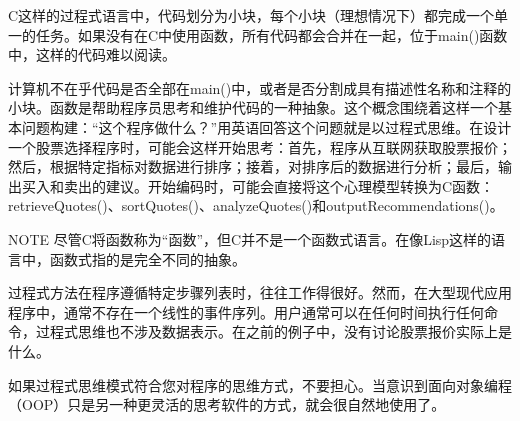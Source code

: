 C这样的过程式语言中，代码划分为小块，每个小块（理想情况下）都完成一个单一的任务。如果没有在C中使用函数，所有代码都会合并在一起，位于main()函数中，这样的代码难以阅读。

计算机不在乎代码是否全部在main()中，或者是否分割成具有描述性名称和注释的小块。函数是帮助程序员思考和维护代码的一种抽象。这个概念围绕着这样一个基本问题构建：“这个程序做什么？”用英语回答这个问题就是以过程式思维。在设计一个股票选择程序时，可能会这样开始思考：首先，程序从互联网获取股票报价；然后，根据特定指标对数据进行排序；接着，对排序后的数据进行分析；最后，输出买入和卖出的建议。开始编码时，可能会直接将这个心理模型转换为C函数：retrieveQuotes()、sortQuotes()、analyzeQuotes()和outputRecommendations()。

\begin{myNotic}{NOTE}
尽管C将函数称为“函数”，但C并不是一个函数式语言。在像Lisp这样的语言中，函数式指的是完全不同的抽象。
\end{myNotic}

过程式方法在程序遵循特定步骤列表时，往往工作得很好。然而，在大型现代应用程序中，通常不存在一个线性的事件序列。用户通常可以在任何时间执行任何命令，过程式思维也不涉及数据表示。在之前的例子中，没有讨论股票报价实际上是什么。

如果过程式思维模式符合您对程序的思维方式，不要担心。当意识到面向对象编程（OOP）只是另一种更灵活的思考软件的方式，就会很自然地使用了。







